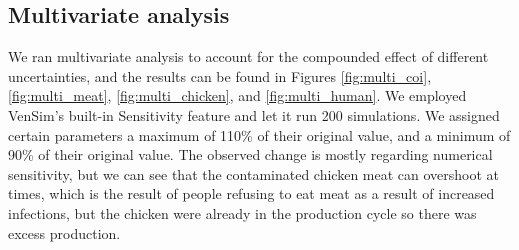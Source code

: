 \subsection{Multivariate analysis}

We ran multivariate analysis to account for the compounded effect of different uncertainties, and the results can be found in Figures \ref{fig:multi_coi}, \ref{fig:multi_meat}, \ref{fig:multi_chicken}, and \ref{fig:multi_human}. We employed VenSim's built-in Sensitivity feature and let it run 200 simulations. We assigned certain parameters a maximum of 110\% of their original value, and a minimum of 90\% of their original value. The observed change is mostly regarding numerical sensitivity, but we can see that the contaminated chicken meat can overshoot at times, which is the result of people refusing to eat meat as a result of increased infections, but the chicken were already in the production cycle so there was excess production.

